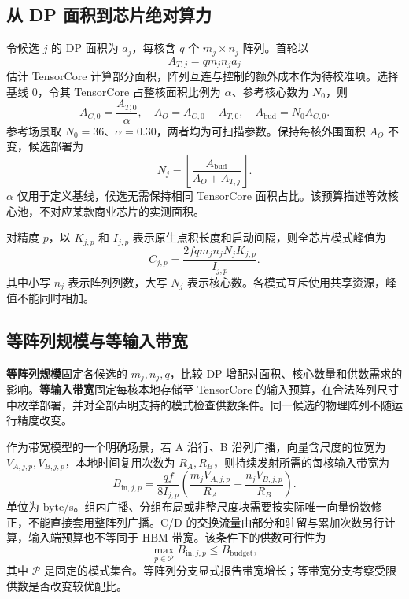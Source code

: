 \subsection{从 DP 面积到芯片绝对算力}
\label{sec:k4_area}

令候选 $j$ 的 DP 面积为 $a_j$，每核含 $q$ 个 $m_j\times n_j$ 阵列。首轮以
\begin{equation}
A_{T,j}=q m_j n_j a_j
\label{eq:tensor_area_model}
\end{equation}
估计 TensorCore 计算部分面积，阵列互连与控制的额外成本作为待校准项。选择基线 $0$，令其 TensorCore 占整核面积比例为 $\alpha$、参考核心数为 $N_0$，则
\begin{equation}
A_{C,0}=\frac{A_{T,0}}{\alpha},\quad
A_O=A_{C,0}-A_{T,0},\quad
A_{\mathrm{bud}}=N_0A_{C,0}.
\label{eq:k4_area_definition}
\end{equation}
参考场景取 $N_0=36$、$\alpha=0.30$，两者均为可扫描参数。保持每核外围面积 $A_O$ 不变，候选部署为
\begin{equation}
N_j=\left\lfloor\frac{A_{\mathrm{bud}}}{A_O+A_{T,j}}\right\rfloor.
\label{eq:core_area_budget}
\end{equation}
$\alpha$ 仅用于定义基线，候选无需保持相同 TensorCore 面积占比。该预算描述等效核心池，不对应某款商业芯片的实测面积。

对精度 $p$，以 $K_{j,p}$ 和 $I_{j,p}$ 表示原生点积长度和启动间隔，则全芯片模式峰值为
\begin{equation}
C_{j,p}=\frac{2f q m_jn_j N_jK_{j,p}}{I_{j,p}}.
\label{eq:k4_capacity_power}
\end{equation}
其中小写 $n_j$ 表示阵列列数，大写 $N_j$ 表示核心数。各模式互斥使用共享资源，峰值不能同时相加。

\subsection{等阵列规模与等输入带宽}
\label{sec:ratio_bandwidth}

\textbf{等阵列规模}固定各候选的 $m_j,n_j,q$，比较 DP 增配对面积、核心数量和供数需求的影响。\textbf{等输入带宽}固定每核本地存储至 TensorCore 的输入预算，在合法阵列尺寸中枚举部署，并对全部声明支持的模式检查供数条件。同一候选的物理阵列不随运行精度改变。

作为带宽模型的一个明确场景，若 A 沿行、B 沿列广播，向量含尺度的位宽为 $V_{A,j,p},V_{B,j,p}$，本地时间复用次数为 $R_A,R_B$，则持续发射所需的每核输入带宽为
\begin{equation}
B_{\mathrm{in},j,p}=\frac{qf}{8I_{j,p}}
\left(\frac{m_jV_{A,j,p}}{R_A}+\frac{n_jV_{B,j,p}}{R_B}\right).
\label{eq:ratio_bandwidth}
\end{equation}
单位为 byte/s。组内广播、分组布局或非整尺度块需要按实际唯一向量份数修正，不能直接套用整阵列广播。C/D 的交换流量由部分和驻留与累加次数另行计算，输入端预算也不等同于 HBM 带宽。该条件下的供数可行性为
\begin{equation}
\max_{p\in\mathcal P}B_{\mathrm{in},j,p}\le B_{\mathrm{budget}},
\label{eq:input_budget}
\end{equation}
其中 $\mathcal P$ 是固定的模式集合。等阵列分支显式报告带宽增长；等带宽分支考察受限供数是否改变较优配比。

